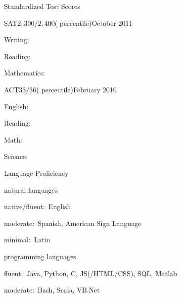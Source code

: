 \documentclass{resume}
\begin{document}
{\begin{rSection}{Standardized Test Scores}
  \begin{rSubSection}{SAT\hspace{7.85em}$2,300/2,400$\hspace{3.9em}\normalfont( percentile)}{October 2011}{}{}
  \item Writing:~\tab\tab{}\tab{}
  \item Reading:~\tab\tab{}\tab{}
  \item Mathematics:~\tab{}\tab{}
  \end{rSubSection}

  \begin{rSubSection}{ACT\hspace{8.75em}$33/36$\hspace{5.3em}\normalfont( percentile)}{February 2010}{}{}
  \item English:~\tab\tab{}\tab\tab{}
  \item Reading:~\tab\tab{}\tab\tab{}
  \item Math:~\tab\tab\tab{}\tab\tab{}
  \item Science:~\tab\tab{}\tab\tab{}
  \end{rSubSection}

  \end{rSection}





  \begin{rSection}{Language Proficiency}

  \begin{rSubSection}{\normalfont natural languages}{}{}{}
  \item native/fluent:~English
  \item moderate:~Spanish, American Sign Language
  \item minimal:~Latin
  \end{rSubSection}

  \begin{rSubSection}{\normalfont programming languages}{}{}{}
  \item fluent:~Java, Python, C, JS(/HTML/CSS), SQL, Matlab
  \item moderate:~Bash, Scala, VB.Net
  \end{rSubSection}


\end{rSection}}
\end{document}
